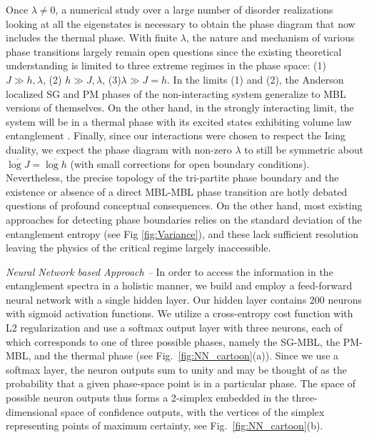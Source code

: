\documentclass[amsmath,amssymb, aps, prb, superscriptaddress,twocolumn]{revtex4-1}
\begin{document}
Once $\lambda\neq0$, a numerical study over a large number of disorder realizations looking at all the eigenstates is necessary to obtain the phase diagram that now includes the thermal phase. With finite $\lambda$, the nature and mechanism of various phase transitions largely remain open questions since the existing theoretical understanding is limited to three extreme regimes in the phase space: (1) $J\gg h, \lambda$, (2) $h\gg J,\lambda$, (3)$\lambda\gg J=h$. In the limits (1) and (2), the Anderson localized SG and PM phases of the non-interacting system generalize to MBL versions of themselves\cite{Huse13, PekkerHilbertGlass, Kjall14}. On the other hand, in the strongly interacting limit, the system will be in a thermal phase with its excited states exhibiting volume law entanglement \cite{Page}. Finally, since our interactions were chosen to respect the Ising duality, we expect the phase diagram with non-zero $\lambda$ to still be symmetric about $\overline{\log J} = \overline{\log h}$ (with small corrections for open boundary conditions). Nevertheless, the precise topology of the tri-partite phase boundary and the existence or absence of a direct MBL-MBL phase transition\cite{de2016stability,Moudgalya2017} are hotly debated questions of profound conceptual consequences.
On the other hand, most existing approaches for detecting phase boundaries  relies on the standard deviation of the entanglement entropy (see Fig \ref{fig:Variance}), and these lack sufficient resolution leaving the physics of the critical regime largely inaccessible.   

{\it Neural Network based Approach --} In order to access the information in the entanglement spectra in a holistic manner, we build and employ a feed-forward neural network with a single hidden layer. Our hidden layer contains 200 neurons with sigmoid activation functions. We utilize a cross-entropy cost function with L2 regularization and use a softmax output layer with three neurons, each of which corresponds to one of three possible phases, namely the SG-MBL, the PM-MBL, and the thermal phase (see Fig.~\ref{fig:NN_cartoon}(a)). Since we use a softmax layer, the neuron outputs sum to unity and may be thought of as the probability that a given phase-space point is in a particular phase. The space of possible neuron outputs thus forms a 2-simplex embedded in the three-dimensional space of confidence outputs, with the vertices of the simplex representing points of maximum certainty, see Fig.~\ref{fig:NN_cartoon}(b). 
\end{document}
